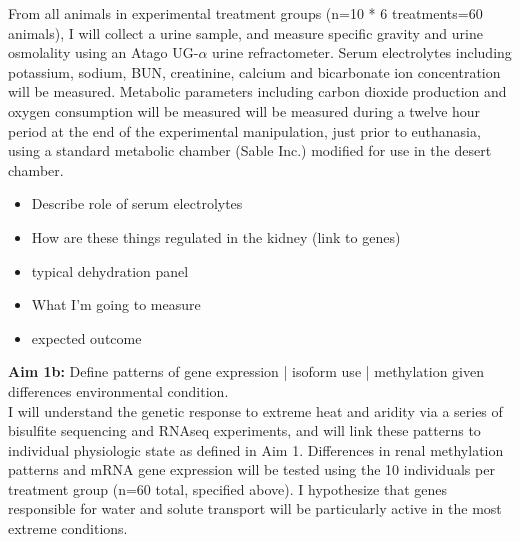 \documentclass[11pt]{article}
\begin{document}
From all animals in experimental treatment groups (n=10 * 6 treatments=60 animals), I will collect a urine sample, and measure specific gravity and urine osmolality using an Atago UG-$\alpha$ urine refractometer. Serum electrolytes including potassium, sodium, BUN, creatinine, calcium and bicarbonate ion concentration will be measured. Metabolic parameters including carbon dioxide production and oxygen consumption will be measured will be measured during a twelve hour period at the end of the experimental manipulation, just prior to euthanasia, using a standard metabolic chamber (Sable Inc.) modified for use in the desert chamber. \\

\begin{itemize}
\item Describe role of serum electrolytes
\item How are these things regulated in the kidney (link to genes)
\item typical dehydration panel
\item What I'm going to measure
\item expected outcome
\end{itemize}



\noindent \textbf{Aim 1b:} Define patterns of gene expression | isoform use | methylation given differences environmental condition. \\

{I will understand the genetic response to extreme heat and aridity via a series of bisulfite sequencing and RNAseq experiments, and will link these patterns to individual physiologic state as defined in Aim 1.} Differences in renal methylation patterns and mRNA gene expression will be tested using the 10 individuals per treatment group (n=60 total, specified above). I hypothesize that genes responsible for water and solute transport will be particularly active in the most extreme conditions.  
\end{document}
